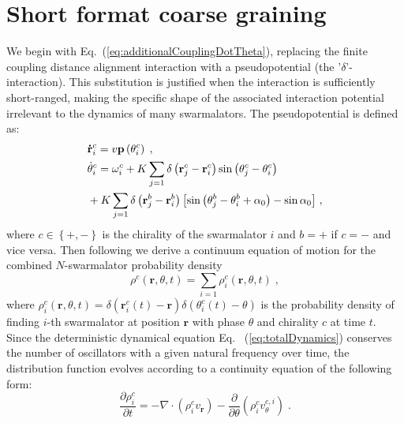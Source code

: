 \documentclass{article}
\begin{document}
\section{Short format coarse graining}
We begin with Eq.~(\ref{eq:additionalCouplingDotTheta}), replacing the finite coupling distance alignment interaction with a pseudopotential (the '$\delta$'-interaction). This substitution is justified when the interaction is sufficiently short-ranged, making the specific shape of the associated interaction potential irrelevant to the dynamics of many swarmalators. The pseudopotential is defined as:
\begin{subequations}
    \begin{align}
        &\mathbf{\dot{r}}_{i}^{c}=v\mathbf{p}\left( \theta _{i}^{c} \right) \;,\\
        &\dot{\theta}_{i}^{c}=\omega _{i}^{c}+K\sum_{j=1}{\delta \left( \mathbf{r}_{j}^{c}-\mathbf{r}_{i}^{c} \right) \sin \left( \theta _{j}^{c}-\theta _{i}^{c} \right)}\notag\\
        &+K\sum_{j=1}{\delta \left( \mathbf{r}_{j}^{b}-\mathbf{r}_{i}^{b} \right) \left[ \sin \left( \theta _{j}^{b}-\theta _{i}^{b}+\alpha _0 \right) -\sin \alpha _0 \right]}\;,
    \end{align}
\end{subequations}
where $c\in\left\{+,-\right\}$ is the chirality of the swarmalator $i$ and $b=+$ if $c=-$ and vice versa.  
Then following \cite{DavidSDean_1996} we derive a continuum equation of motion for the combined $N$-swarmalator probability density
\begin{equation}
    \label{eq:globalContinuityDef}
    \rho ^c\left( \mathbf{r},\theta ,t \right) =\sum_{i=1}{\rho _{i}^{c}\left( \mathbf{r},\theta ,t \right)}\;,
\end{equation}
where $\rho _{i}^{c}\left( \mathbf{r},\theta ,t \right) =\delta \left( \mathbf{r}_{i}^{c}\left( t \right) -\mathbf{r} \right) \delta \left( \theta _{i}^{c}\left( t \right) -\theta \right)$ is the probability density of finding $i$-th swarmalator at position $\mathbf{r}$ with phase $\theta$ and chirality $c$ at time $t$.
Since the deterministic dynamical equation Eq.~ (\ref{eq:totalDynamics}) conserves the number of oscillators with a given natural frequency over time, the distribution function evolves according to a continuity equation of the following form:
\begin{equation}
    \frac{\partial \rho _{i}^{c}}{\partial t}=-\nabla \cdot \left( \rho _{i}^{c}v_{\mathbf{r}} \right) -\frac{\partial }{\partial \theta}\left( \rho _{i}^{c}v_{\theta}^{c,i} \right)\;.
    \label{eq:singleContinuity}
\end{equation}
\end{document}
